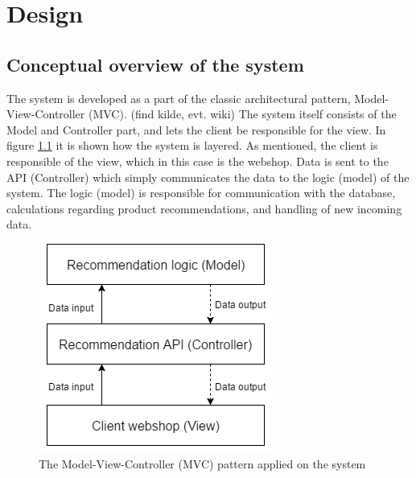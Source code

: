 
\chapter{Design} %

\label{Chapter3} %


\section{Conceptual overview of the system}
The system is developed as a part of the classic architectural pattern, Model-View-Controller (MVC).\color{red} (find kilde, evt. wiki) \color{black} The system itself consists of the Model and Controller part, and lets the client be responsible for the view. In figure \ref{fig:MVC} it is shown how the system is layered. As mentioned, the client is responsible of the view, which in this case is the webshop. Data is sent to the API (Controller) which simply communicates the data to the logic (model) of the system. The logic (model) is responsible for communication with the database, calculations regarding product recommendations, and handling of new incoming data.

\begin{figure}
	\centering
	\includegraphics[width=.4\linewidth]{Figures/MVC.png}
	\caption{The Model-View-Controller (MVC) pattern applied on the system}
	\label{fig:MVC}
\end{figure}

